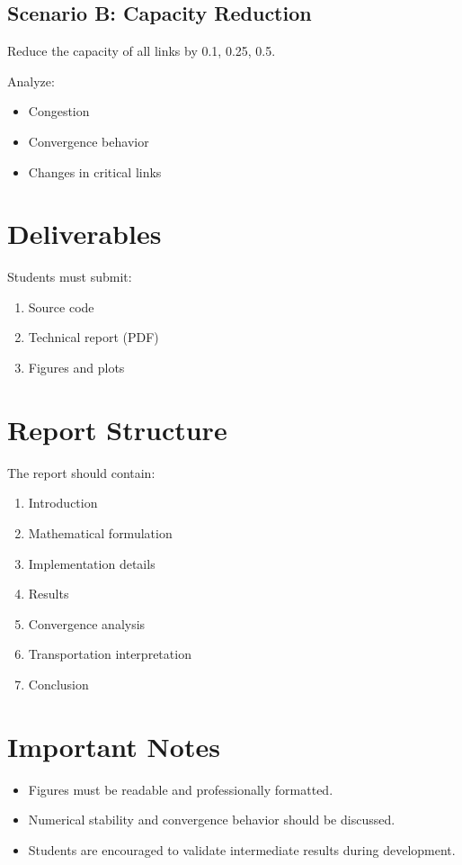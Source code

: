 \documentclass{rapportCS} %
\begin{document}
\subsection{Scenario B: Capacity Reduction}

Reduce the capacity of all links by 0.1, 0.25, 0.5.

Analyze:
\begin{itemize}
    \item Congestion
    \item Convergence behavior
    \item Changes in critical links
\end{itemize}

\section{Deliverables}

Students must submit:

\begin{enumerate}
    \item Source code
    \item Technical report (PDF)
    \item Figures and plots
\end{enumerate}

\section{Report Structure}

The report should contain:

\begin{enumerate}
    \item Introduction
    \item Mathematical formulation
    \item Implementation details
    \item Results
    \item Convergence analysis
    \item Transportation interpretation
    \item Conclusion
\end{enumerate}

\section{Important Notes}

\begin{itemize}
    \item Figures must be readable and professionally formatted.
    \item Numerical stability and convergence behavior should be discussed.
    \item Students are encouraged to validate intermediate results during development.
\end{itemize}

%
% 
\end{document}
